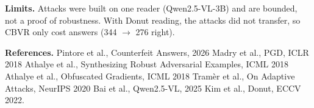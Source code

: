 \documentclass{article}
\newcommand{\note}[1]{{\fontsize{21}{26}\selectfont\color{Mute}#1\par}}
\begin{document}
\begin{tcbposter}
{{\begin{card}
\note{\textbf{Limits.} Attacks were built on one reader (Qwen2.5-VL-3B) and are bounded, not a proof of robustness. With Donut reading, the attacks did not transfer, so CBVR only cost answers (344 $\rightarrow$ 276 right).}
\vspace{4mm}

{\fontsize{20}{25}\selectfont\color{Ink}
\textbf{References.}
Pintore et al., Counterfeit Answers, 2026 \textbullet{}
Madry et al., PGD, ICLR 2018 \textbullet{}
Athalye et al., Synthesizing Robust Adversarial Examples, ICML 2018 \textbullet{}
Athalye et al., Obfuscated Gradients, ICML 2018 \textbullet{}
Tram\`er et al., On Adaptive Attacks, NeurIPS 2020 \textbullet{}
Bai et al., Qwen2.5-VL, 2025 \textbullet{}
Kim et al., Donut, ECCV 2022.\par}
\end{card}
}}

\end{tcbposter}
\end{document}
